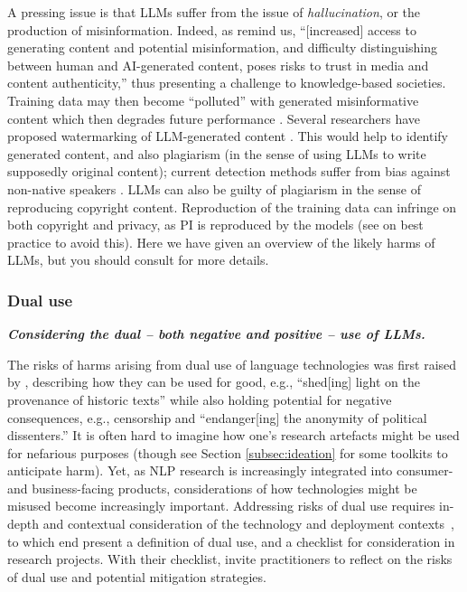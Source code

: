 A pressing issue is that LLMs suffer from the issue of \textit{hallucination}, or the production of misinformation.
Indeed, as \citet{Solaiman_Evaluating_2024} remind us, ``[increased] access to generating content and potential misinformation, and difficulty distinguishing between human and AI-generated content, poses risks to trust in media and content authenticity,'' thus presenting a challenge to knowledge-based societies. Training data may then become ``polluted'' with generated misinformative content which then degrades future performance \citep{pan_risk_2023}. Several researchers have proposed watermarking of LLM-generated content \cite{kirchenbauer_watermark_2023, grinbaum_ethical_2022}. This would help to identify generated content, and also plagiarism (in the sense of using LLMs to write supposedly original content); current detection methods suffer from bias against non-native speakers \citep{liang_gpt_2023}. LLMs can also be guilty of plagiarism in the sense of reproducing copyright content. Reproduction of the training data can infringe on both copyright and privacy, as PI is reproduced by the models \citep{lee_language_2022, huang_are_2022, lukas_analyzing_2023} (see  on best practice to avoid this). 
Here we have given an overview of the likely harms of LLMs, but you should consult \citet{Solaiman_Evaluating_2024,weidinger_ethical_2021, kumar_language_2022} for more details. 

\subsubsection{Dual use}
\noindent\textbf{\textit{Considering the dual -- both negative and positive -- use of LLMs.}}
\newline 

\noindent The risks of harms arising from dual use of language technologies was first raised by \citet{hovy_social_2016}, describing how they can be used for good, e.g., ``shed[ing] light on the provenance of historic texts''
while also holding potential for negative consequences, e.g., censorship and ``endanger[ing] the anonymity of political dissenters.''
It is often hard to imagine how one's research artefacts might be used for nefarious purposes (though see Section \cref{subsec:ideation} for some toolkits to anticipate harm).
Yet, as NLP research is increasingly integrated into consumer- and business-facing products, considerations of how technologies might be misused become increasingly important. Addressing risks of dual use requires in-depth and contextual consideration of the technology and deployment contexts~\citep{kaffee_thorny_2023}, to which end \citet{kaffee_thorny_2023} present a definition of dual use, and a checklist for consideration in research projects.
With their checklist, \citet{kaffee_thorny_2023} invite practitioners to reflect on the risks of dual use and potential mitigation strategies.

